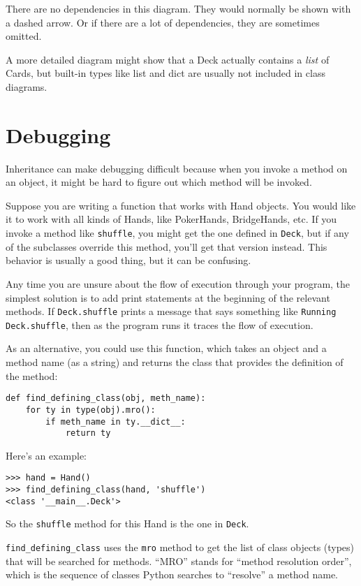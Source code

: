 \documentclass[10pt]{book}
\begin{document}
There are no dependencies in this diagram.  They would normally
be shown with a dashed arrow.  Or if there are a lot of
dependencies, they are sometimes omitted.

A more detailed diagram might show that a Deck actually
contains a {\em list} of Cards, but built-in types
like list and dict are usually not included in class diagrams.


\section{Debugging}

Inheritance can make debugging difficult because when you invoke a
method on an object, it might be hard to figure out which method will
be invoked.  

Suppose you are writing a function that works with Hand objects.
You would like it to work with all kinds of Hands, like
PokerHands, BridgeHands, etc.  If you invoke a method like
{\tt shuffle}, you might get the one defined in {\tt Deck},
but if any of the subclasses override this method, you'll
get that version instead.  This behavior is usually a good
thing, but it can be confusing.

Any time you are unsure about the flow of execution through your
program, the simplest solution is to add print statements at the
beginning of the relevant methods.  If {\tt Deck.shuffle} prints a
message that says something like {\tt Running Deck.shuffle}, then as
the program runs it traces the flow of execution.

As an alternative, you could use this function, which takes an
object and a method name (as a string) and returns the class that
provides the definition of the method:

\begin{verbatim}
def find_defining_class(obj, meth_name):
    for ty in type(obj).mro():
        if meth_name in ty.__dict__:
            return ty
\end{verbatim}
%
Here's an example:

\begin{verbatim}
>>> hand = Hand()
>>> find_defining_class(hand, 'shuffle')
<class '__main__.Deck'>
\end{verbatim}
%
So the {\tt shuffle} method for this Hand is the one in {\tt Deck}.

\verb"find_defining_class" uses the {\tt mro} method to get the list
of class objects (types) that will be searched for methods.  ``MRO''
stands for ``method resolution order'', which is the sequence of
classes Python searches to ``resolve'' a method name.
\end{document}
